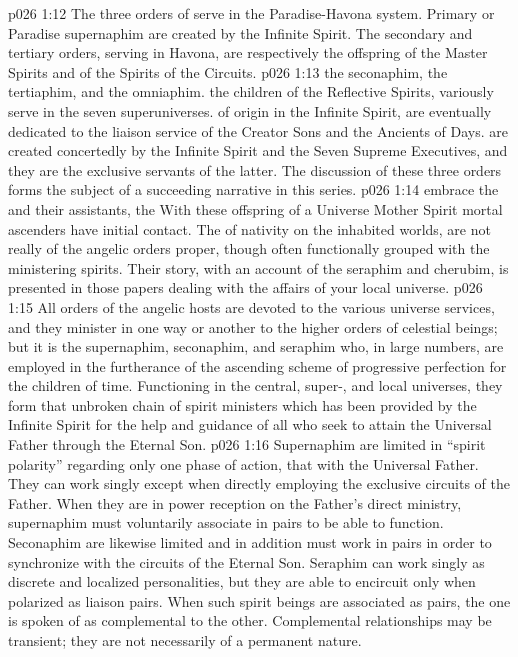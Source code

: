 \vs p026 1:12 \bibnobreakspace {} The three orders of  serve in the Paradise\hyp{}Havona system. Primary or Paradise supernaphim are created by the Infinite Spirit. The secondary and tertiary orders, serving in Havona, are respectively the offspring of the Master Spirits and of the Spirits of the Circuits.
\vs p026 1:13 \bibnobreakspace {} the seconaphim, the tertiaphim, and the omniaphim.  the children of the Reflective Spirits, variously serve in the seven superuniverses.  of origin in the Infinite Spirit, are eventually dedicated to the liaison service of the Creator Sons and the Ancients of Days.  are created concertedly by the Infinite Spirit and the Seven Supreme Executives, and they are the exclusive servants of the latter. The discussion of these three orders forms the subject of a succeeding narrative in this series.
\vs p026 1:14 \bibnobreakspace {} embrace the  and their assistants, the  With these offspring of a Universe Mother Spirit mortal ascenders have initial contact. The  of nativity on the inhabited worlds, are not really of the angelic orders proper, though often functionally grouped with the ministering spirits. Their story, with an account of the seraphim and cherubim, is presented in those papers dealing with the affairs of your local universe.
\vs p026 1:15 \pc All orders of the angelic hosts are devoted to the various universe services, and they minister in one way or another to the higher orders of celestial beings; but it is the supernaphim, seconaphim, and seraphim who, in large numbers, are employed in the furtherance of the ascending scheme of progressive perfection for the children of time. Functioning in the central, super-, and local universes, they form that unbroken chain of spirit ministers which has been provided by the Infinite Spirit for the help and guidance of all who seek to attain the Universal Father through the Eternal Son.
\vs p026 1:16 Supernaphim are limited in “spirit polarity” regarding only one phase of action, that with the Universal Father. They can work singly except when directly employing the exclusive circuits of the Father. When they are in power reception on the Father’s direct ministry, supernaphim must voluntarily associate in pairs to be able to function. Seconaphim are likewise limited and in addition must work in pairs in order to synchronize with the circuits of the Eternal Son. Seraphim can work singly as discrete and localized personalities, but they are able to encircuit only when polarized as liaison pairs. When such spirit beings are associated as pairs, the one is spoken of as complemental to the other. Complemental relationships may be transient; they are not necessarily of a permanent nature.
